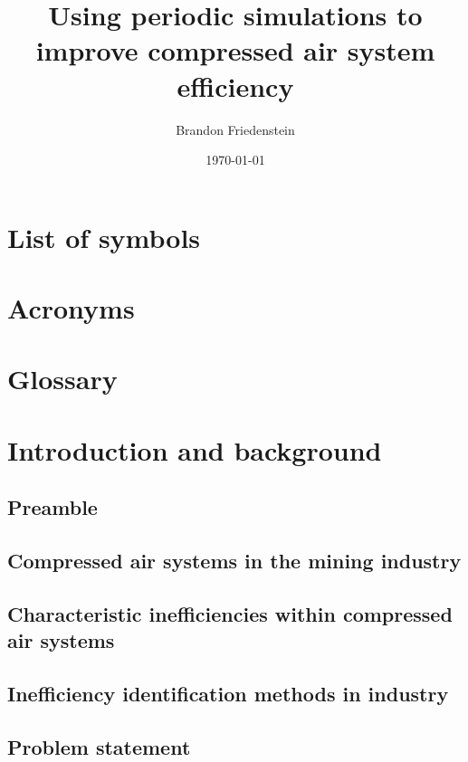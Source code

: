 \documentclass[12pt, english, oneside, singlespacing, open=any]{report}
\begin{document}
	
\title{Using periodic simulations to improve compressed air system efficiency}
\date{\today}
\author{Brandon Friedenstein}

\begin{titlepage}
	\maketitle
\end{titlepage}

\tableofcontents
\begin{abstract}
\end{abstract}
\chapter*{List of symbols}
\chapter*{Acronyms}
\chapter*{Glossary}

\chapter{Introduction and background}
\section{Preamble}
	\section{Compressed air systems in the mining industry}
	 \section{Characteristic inefficiencies within compressed air systems }
	 \section{Inefficiency identification methods in industry}
	 \section{Problem statement}
\end{document}
